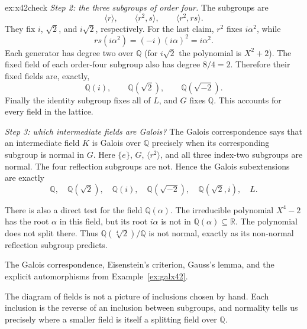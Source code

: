 \begin{solution}{ex:x42check}
\emph{Step 2: the three subgroups of order four.}
The subgroups are
\[
\langle r\rangle,\qquad
\langle r^2,s\rangle,\qquad
\langle r^2,rs\rangle.
\]
They fix $i$, $\sqrt2$, and $i\sqrt2$, respectively. For the last claim, $r^2$ fixes $i\alpha^2$, while
\[
rs(i\alpha^2)=(-i)(i\alpha)^2=i\alpha^2.
\]
Each generator has degree two over $\mathbb Q$ (for $i\sqrt2$ the polynomial is $X^2+2$). The fixed field of each order-four subgroup also has degree $8/4=2$. Therefore their fixed fields are, exactly,
\[
\mathbb Q(i),\qquad\mathbb Q(\sqrt2),\qquad\mathbb Q(\sqrt{-2}).
\]
Finally the identity subgroup fixes all of $L$, and $G$ fixes $\mathbb Q$. This accounts for every field in the lattice.

\emph{Step 3: which intermediate fields are Galois?}
The Galois correspondence says that an intermediate field $K$ is Galois over $\mathbb Q$ precisely when its corresponding subgroup is normal in $G$. Here $\{e\}$, $G$, $\langle r^2\rangle$, and all three index-two subgroups are normal. The four reflection subgroups are not. Hence the Galois subextensions are exactly
\[
\mathbb Q,\quad\mathbb Q(\sqrt2),\quad\mathbb Q(i),\quad
\mathbb Q(\sqrt{-2}),\quad\mathbb Q(\sqrt2,i),\quad L.
\]

There is also a direct test for the field $\mathbb Q(\alpha)$. The irreducible polynomial $X^4-2$ has the root $\alpha$ in this field, but its root $i\alpha$ is not in $\mathbb Q(\alpha)\subseteq\mathbb R$. The polynomial does not split there. Thus $\mathbb Q(\sqrt[4]{2})/\mathbb Q$ is not normal, exactly as its non-normal reflection subgroup predicts.

\tools The Galois correspondence, Eisenstein's criterion, Gauss's lemma, and the explicit automorphisms from Example~\ref{ex:galx42}.

\leads The diagram of fields is not a picture of inclusions chosen by hand. Each inclusion is the reverse of an inclusion between subgroups, and normality tells us precisely where a smaller field is itself a splitting field over $\mathbb Q$.
\end{solution}

